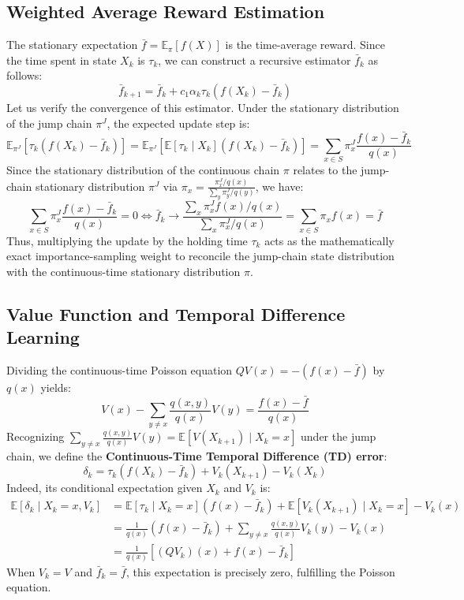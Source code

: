 \documentclass[11pt]{article}
\begin{document}
\subsection{Weighted Average Reward Estimation}
The stationary expectation $\bar{f} = \mathbb{E}_\pi[f(X)]$ is the time-average reward. Since the time spent in state $X_k$ is $\tau_k$, we can construct a recursive estimator $\bar{f}_k$ as follows:
\begin{equation}
    \bar{f}_{k+1} = \bar{f}_k + c_1 \alpha_k \tau_k (f(X_k) - \bar{f}_k)
\end{equation}
Let us verify the convergence of this estimator. Under the stationary distribution of the jump chain $\pi^J$, the expected update step is:
\begin{equation}
    \mathbb{E}_{\pi^J} [ \tau_k (f(X_k) - \bar{f}_k) ] = \mathbb{E}_{\pi^J} [ \mathbb{E}[\tau_k \mid X_k] (f(X_k) - \bar{f}_k) ] = \sum_{x \in S} \pi^J_x \frac{f(x) - \bar{f}_k}{q(x)}
\end{equation}
Since the stationary distribution of the continuous chain $\pi$ relates to the jump-chain stationary distribution $\pi^J$ via $\pi_x = \frac{\pi^J_x / q(x)}{\sum_y \pi^J_y / q(y)}$, we have:
\begin{equation}
    \sum_{x \in S} \pi^J_x \frac{f(x) - \bar{f}_k}{q(x)} = 0 \iff \bar{f}_k \to \frac{\sum_x \pi^J_x f(x)/q(x)}{\sum_x \pi^J_x / q(x)} = \sum_{x \in S} \pi_x f(x) = \bar{f}
\end{equation}
Thus, multiplying the update by the holding time $\tau_k$ acts as the mathematically exact importance-sampling weight to reconcile the jump-chain state distribution with the continuous-time stationary distribution $\pi$.

\subsection{Value Function and Temporal Difference Learning}
Dividing the continuous-time Poisson equation $Q V(x) = -(f(x) - \bar{f})$ by $q(x)$ yields:
\begin{equation}
    V(x) - \sum_{y \neq x} \frac{q(x, y)}{q(x)} V(y) = \frac{f(x) - \bar{f}}{q(x)}
\end{equation}
Recognizing $\sum_{y \neq x} \frac{q(x,y)}{q(x)} V(y) = \mathbb{E}[V(X_{k+1}) \mid X_k = x]$ under the jump chain, we define the \textbf{Continuous-Time Temporal Difference (TD) error}:
\begin{equation}
    \delta_k = \tau_k (f(X_k) - \bar{f}_k) + V_k(X_{k+1}) - V_k(X_k)
\end{equation}
Indeed, its conditional expectation given $X_k$ and $V_k$ is:
\begin{align}
    \mathbb{E}[\delta_k \mid X_k = x, V_k] &= \mathbb{E}[\tau_k \mid X_k = x](f(x) - \bar{f}_k) + \mathbb{E}[V_k(X_{k+1}) \mid X_k = x] - V_k(x) \nonumber \\
    &= \frac{1}{q(x)} (f(x) - \bar{f}_k) + \sum_{y \neq x} \frac{q(x,y)}{q(x)} V_k(y) - V_k(x) \nonumber \\
    &= \frac{1}{q(x)} \left[ (Q V_k)(x) + f(x) - \bar{f}_k \right]
\end{align}
When $V_k = V$ and $\bar{f}_k = \bar{f}$, this expectation is precisely zero, fulfilling the Poisson equation.
\end{document}
